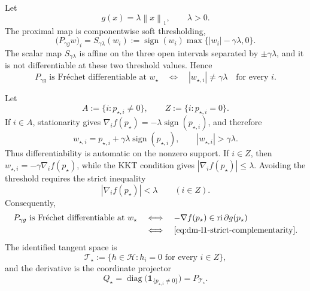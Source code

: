 \documentclass[10pt,leqno]{amsart}
\numberwithin{equation}{section}
\numberwithin{algorithm}{section}
\theoremstyle{remark}
\newcommand{\Hcal}{\mathcal{H}}
\newcommand{\subd}{\partial}
\DeclareMathOperator{\diag}{diag}
\newcommand{\norm}[1]{\left\lVert #1 \right\rVert}
\newcommand{\grad}{\nabla}
\begin{document}
Let
\begin{equation}
\label{eq:dm-l1-g}
    g(x)=\lambda\norm{x}_1,
    \qquad \lambda>0.
\end{equation}
The proximal map is componentwise soft thresholding,
\begin{equation}
\label{eq:dm-l1-soft-threshold}
   \bigl(P_{\gamma g}w\bigr)_i
      =S_{\gamma\lambda}(w_i)
      :=\operatorname{sign}(w_i)
         \max\{|w_i|-\gamma\lambda,0\}.
\end{equation}
The scalar map \(S_{\gamma\lambda}\) is affine on the three open intervals separated by
\(
 \pm\gamma\lambda
\), and it is not differentiable at these two threshold values.  Hence
\begin{equation}
\label{eq:dm-l1-prox-diff-raw}
   P_{\gamma g}\text{ is Fr\'echet differentiable at }w_\star
   \quad\Longleftrightarrow\quad
   |w_{\star,i}|\ne\gamma\lambda
   \quad\text{for every }i.
\end{equation}

Let
\begin{equation}
\label{eq:dm-l1-active-sets}
   A:=\{i:p_{\star,i}\ne0\},
   \qquad
   Z:=\{i:p_{\star,i}=0\}.
\end{equation}
If \(i\in A\), stationarity gives
\(
 \grad_i f(p_\star)=-\lambda\operatorname{sign}(p_{\star,i})
\), and therefore
\[
   w_{\star,i}
     =p_{\star,i}+\gamma\lambda\operatorname{sign}(p_{\star,i}),
     \qquad
   |w_{\star,i}|>\gamma\lambda.
\]
Thus differentiability is automatic on the nonzero support.  If \(i\in Z\), then
\(
 w_{\star,i}=-\gamma\grad_i f(p_\star)
\), while the KKT condition gives
\(
 |\grad_i f(p_\star)|\le\lambda
\).  Avoiding the threshold requires the strict inequality
\begin{equation}
\label{eq:dm-l1-strict-complementarity}
   |\grad_i f(p_\star)|<\lambda
   \qquad(i\in Z).
\end{equation}
Consequently,
\begin{equation}
\label{eq:dm-l1-equivalence}
   \begin{aligned}
   P_{\gamma g}\text{ is Fr\'echet differentiable at }w_\star
   &\quad\Longleftrightarrow\quad
   -\grad f(p_\star)\in\operatorname{ri}\subd g(p_\star)\\
   &\quad\Longleftrightarrow\quad
   \eqref{eq:dm-l1-strict-complementarity}.
   \end{aligned}
\end{equation}
The identified tangent space is
\begin{equation}
\label{eq:dm-l1-tangent}
   \mathcal T_\star
     :=\{h\in\Hcal:h_i=0\text{ for every }i\in Z\},
\end{equation}
and the derivative is the coordinate projector
\begin{equation}
\label{eq:dm-l1-Q}
   Q_\star
     =\diag\bigl(\mathbf 1_{\{p_{\star,i}\ne0\}}\bigr)
     =P_{\mathcal T_\star}.
\end{equation}
\end{document}
